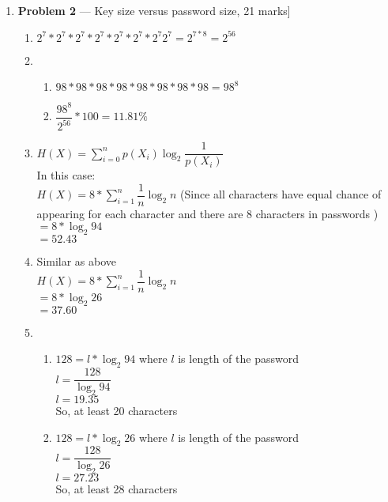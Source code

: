 \documentclass[11pt]{article}
\theoremstyle{definition}
\begin{document}
\begin{enumerate}
		\newpage
		\item[] \textbf{Problem 2} --- Key size versus password size, 21 marks]
	
	
	
	\begin{enumerate}
		\item $2^{7}*2^{7}*2^{7}*2^{7}*2^{7}*2^{7}*2^{7}2^{7} = 2^{7*8} = 2^{56}$
		\item
		
		\begin{enumerate}
			\item $98*98*98*98*98*98*98*98 = 98^{8}$
			\item$\dfrac{98^8}{2^{56}} * 100 = 11.81\%$
		\end{enumerate}
		
		\item $H(X) = {\sum}_{i=0}^{n} p(X_{i}) \log_{2} \dfrac{1}{p(X_{i})}$\\
		In this case:\\
		$H(X) = 8 * {\sum}_{i=1}^{n} \dfrac{1}{n} \log_{2} n$ (Since all characters have equal chance of appearing for each character and there are 8 characters in passwords )\\
		$= 8 * \log_{2} 94$\\
		$ = 52.43$
		
		\item Similar as above\\
		$H(X) = 8 * {\sum}_{i=1}^{n} \dfrac{1}{n} \log_{2} n$\\
		$= 8 * \log_{2} 26$\\
		$= 37.60$

		\item
		\begin{enumerate}
			\item $128 = l * \log_{2} 94 $ where $l$ is length of the password\\ 
			$l = \dfrac{128}{\log_{2} 94}$\\
			$l = 19.35$\\
			So, at least 20 characters
			
			\item $128 = l * \log_{2} 26 $ where $l$ is length of the password\\
			$l = \dfrac{128}{\log_{2} 26}$\\
			$l = 27.23$\\
			So, at least 28 characters
			
		\end{enumerate}
	\end{enumerate}
	

\end{enumerate}
\end{document}
